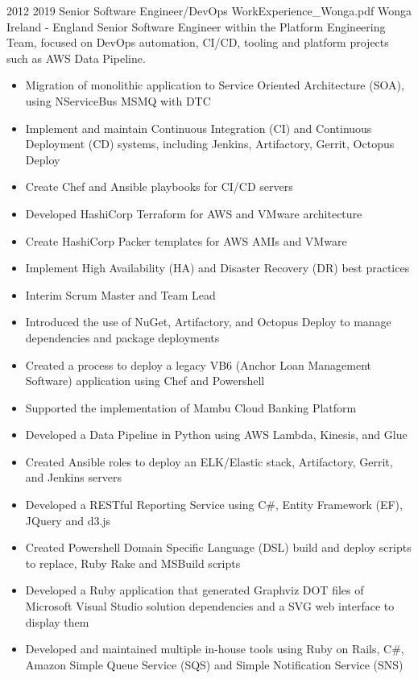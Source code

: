 \begin{twenty}
\twentyitem
  {2012}
  {2019}
  {Senior Software Engineer/DevOps}
  {WorkExperience_Wonga.pdf}
  {Wonga}
  {Ireland - England}
  {Senior Software Engineer within the Platform Engineering Team, focused on DevOps automation, CI/CD, tooling and platform projects such as AWS Data Pipeline.}
  {\begin{itemize}
    \item Migration of monolithic application to Service Oriented Architecture (SOA), using NServiceBus MSMQ with DTC
    \item Implement and maintain Continuous Integration (CI) and Continuous Deployment (CD) systems, including Jenkins, Artifactory, Gerrit, Octopus Deploy
    \item Create Chef and Ansible playbooks for CI/CD servers
    \item Developed HashiCorp Terraform for AWS and VMware architecture
    \item Create HashiCorp Packer templates for AWS AMIs and VMware
    \item Implement High Availability (HA) and Disaster Recovery (DR) best practices
    \item Interim Scrum Master and Team Lead
  \end{itemize}
  }
  {\begin{itemize}
    \item Introduced the use of NuGet, Artifactory, and Octopus Deploy to manage dependencies and package deployments
    \item Created a process to deploy a legacy VB6 (Anchor Loan Management Software) application using Chef and Powershell
    \item Supported the implementation of Mambu Cloud Banking Platform
    \item Developed a Data Pipeline in Python using AWS Lambda, Kinesis, and Glue
    \item Created Ansible roles to deploy an ELK/Elastic stack, Artifactory, Gerrit, and Jenkins servers
    \item Developed a RESTful Reporting Service using C\#, Entity Framework (EF), JQuery and d3.js
    \item Created Powershell Domain Specific Language (DSL) build and deploy scripts to replace, Ruby Rake and MSBuild scripts
    \item Developed a Ruby application that generated Graphviz DOT files of Microsoft Visual Studio solution dependencies and a SVG web interface to display them
    \item Developed and maintained multiple in-house tools using Ruby on Rails, C\#, Amazon Simple Queue Service (SQS) and Simple Notification Service (SNS)
  \end{itemize}
  }
\end{twenty}
